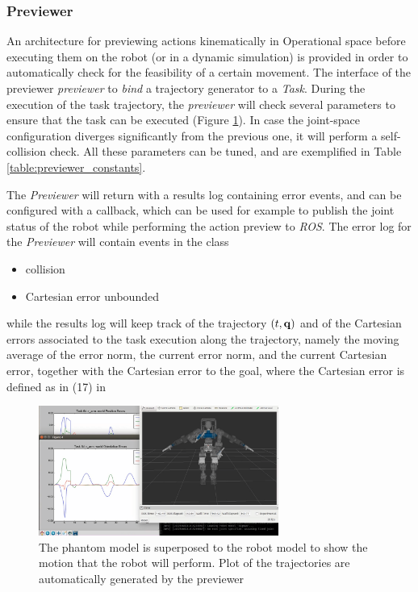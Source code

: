 \subsubsection{Previewer}
\label{subsec:Previewer}
An architecture for previewing actions kinematically in Operational space before executing them on the robot (or in a dynamic simulation) is provided in order to automatically check for the feasibility of a certain movement. The interface of the previewer \emph{previewer} to \emph{bind} a trajectory generator to a \emph{Task}. During the execution of the task trajectory, the \emph{previewer} will check several parameters to ensure that the task can be executed (Figure \ref{fig:previewer}). In case the joint-space configuration diverges significantly from the previous one, it will perform a self-collision check. All these parameters can be tuned, and are exemplified in Table \ref{table:previewer_constants}.

The \emph{Previewer} will return with a results log containing error events, and can be configured with a callback, which can be used for example to publish the joint status of the robot while performing the action preview to \emph{ROS}.
The error log for the \emph{Previewer} will contain events in the class
\begin{itemize}
\item collision
\item Cartesian error unbounded
\end{itemize}
while the results log will keep track of the trajectory $(t,\mathbf{q})$ and of the Cartesian errors associated to the task execution along the trajectory, namely the moving average of the error norm, the current error norm, and the current Cartesian error, together with the Cartesian error to the goal, where the Cartesian error is defined as in (17) in \cite{rocchimingo:16}
\begin{figure}
\vspace{2 mm}
\centering \includegraphics[width=0.7\textwidth]{images/software/previewer} 
\caption{The phantom model is superposed to the robot model to show the motion that the robot will perform. Plot of the trajectories are automatically generated by the previewer} 
\label{fig:previewer}
\end{figure}

